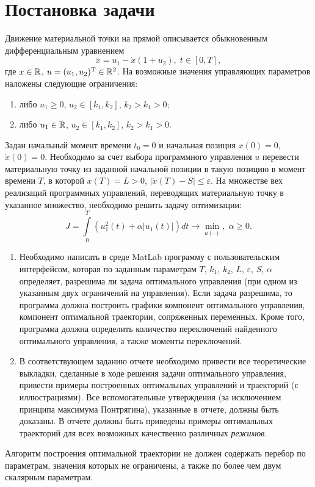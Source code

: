 \section{Постановка задачи}

Движение материальной точки на прямой описывается обыкновенным дифференциальным уравнением
\begin{equation} \label{eq:main_equation}
        \ddot x = u_1 - \dot x (1 + u_2), \; t \in [0, T],
\end{equation}
где $x \in \mathbb{R}$, $u = (u_1, u_2)^{\mathrm{T}} \in \mathbb{R}^2$. На возможные значения управляющих параметров наложены следующие ограничения:
\begin{enumerate}
        \item либо $u_1 \geqslant 0$, $u_2 \in [k_1, k_2]$, $k_2 > k_1 > 0$;
        \item либо $u_1 \in \mathbb{R}$, $u_2 \in [k_1, k_2]$, $k_2 > k_1 > 0$.
\end{enumerate}
Задан начальный момент времени $t_0 = 0$ и начальная позиция $x(0) = 0$, $\dot x(0) = 0$. Необходимо за счет выбора программного управления $u$ перевести материальную точку из заданной начальной позиции в такую позицию в момент времени $T$, в которой $x(T) = L > 0$, $|\dot x(T) - S| \leqslant \varepsilon$. На множестве вех реализаций программных управлений, переводящих материальную точку в указанное множество, необходимо решить задачу оптимизации:
$$
        J = \int\limits_0^T \left( u_1^2(t) + \alpha |u_1(t)| \right) dt \to \min\limits_{u(\cdot)}, \; \alpha \geqslant 0.
$$
\begin{enumerate}
        \item Необходимо написать в среде MatLab программу с пользовательским интерфейсом, которая по заданным параметрам $T$, $k_1$, $k_2$, $L$, $\varepsilon$, $S$, $\alpha$ определяет, разрешима ли задача оптимального управления (при одном из указанным двух ограничений на управления). Если задача разрешима, то программа должна построить графики компонент оптимального управления, компонент оптимальной траектории, сопряженных переменных. Кроме того, программа должна определить количество переключений найденного оптимального управления, а также моменты переключений.
        \item В соответствующем заданию отчете необходимо привести все теоретические выкладки, сделанные в ходе решения задачи оптимального управления, привести примеры построенных оптимальных управлений и траекторий (с иллюстрациями). Все вспомогательные утверждения (за исключением принципа максимума Понтрягина), указанные в отчете, должны быть доказаны. В отчете должны быть приведены примеры оптимальных траекторий для всех возможных качественно различных \textit{режимов}.
\end{enumerate}
\begin{remark}
        Алгоритм построения оптимальной траектории не должен содержать перебор по параметрам, значения которых не ограничены, а также по более чем двум скалярным параметрам.
\end{remark}